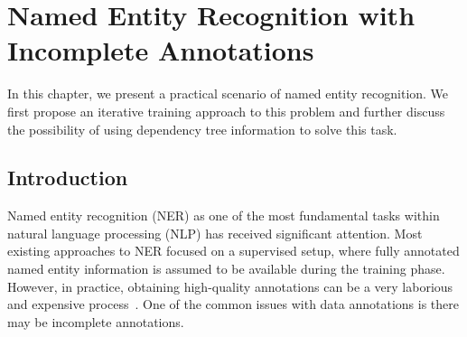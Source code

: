 
\chapter{Named Entity Recognition with Incomplete Annotations} %

\label{Chapter5}

In this chapter, we present a practical scenario of named entity recognition. 
We first propose an iterative training approach to this problem and  further discuss the possibility of using dependency tree information to solve this task. 
\section{Introduction}
\label{sec:betterintro}
Named entity recognition (NER) \cite{tjong2002introduction,tjong2003introduction} as one of the most fundamental tasks within natural language processing (NLP) has received significant attention.
Most existing approaches to NER focused on a supervised setup, where fully annotated named entity information is assumed to be available during the training phase.
However, in practice, obtaining high-quality annotations  can be a very laborious and expensive process~\cite{snow2008cheap}. 
One of the common issues with data annotations is there may be incomplete annotations.



